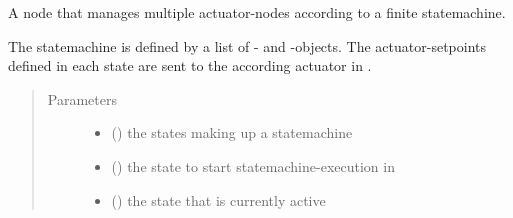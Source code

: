 \documentclass[a4paper,12pt,english]{article}
\begin{document}

\begin{fulllineitems}
\label{\detokenize{osbk_operation:osbk_operation.actuator_state_machine.ActuatorStateMachine}}
A node that manages multiple actuator-nodes according to a finite statemachine.

The statemachine is defined by a list of - and -objects. The 
actuator-setpoints defined in each state are sent to the according actuator in .
\begin{quote}\begin{description}
\item[{Parameters}] \leavevmode\begin{itemize}
\item {} 
 (\sphinxstyleliteralemphasis{\sphinxupquote{{[}}}{\hyperref[\detokenize{osbk_operation:osbk_operation.utility.State}]{\sphinxcrossref{\sphinxstyleliteralemphasis{\sphinxupquote{State}}}}}\sphinxstyleliteralemphasis{\sphinxupquote{{]}}}) \textendash{} the states making up a statemachine

\item {} 
 ({\hyperref[\detokenize{osbk_operation:osbk_operation.utility.State}]{}}) \textendash{} the state to start statemachine-execution in

\item {} 
 ({\hyperref[\detokenize{osbk_operation:osbk_operation.utility.State}]{}}) \textendash{} the state that is currently active


\end{itemize}
\end{description}
\end{quote}
\end{fulllineitems}
\end{document}

